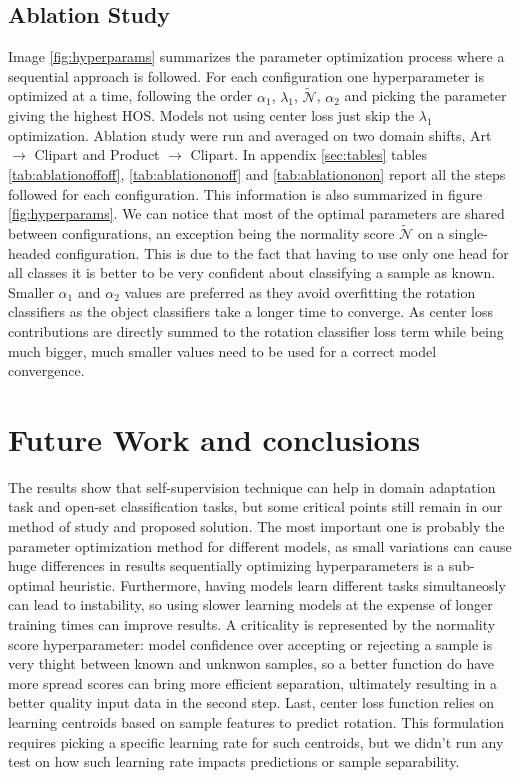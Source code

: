 \documentclass[10pt,twocolumn,letterpaper]{article}
\begin{document}
\subsection{Ablation Study}
\label{sec:ablation_study}
Image \ref{fig:hyperparams} summarizes the parameter optimization process where a sequential approach is followed.
For each configuration one hyperparameter is optimized at a time,
following the order
$\alpha_1$, $\lambda_1$, $\mathcal{\tilde N}$, $\alpha_2$ and picking the parameter giving the highest HOS.
Models not using center loss just skip the $\lambda_1$ optimization.
Ablation study were run and averaged on two domain shifts, 
Art $\to$ Clipart and Product $\to$ Clipart.
In appendix \ref{sec:tables} tables \ref{tab:ablationoffoff}, \ref{tab:ablationonoff} and \ref{tab:ablationonon} report all the steps followed for each configuration.
This information is also summarized in figure \ref{fig:hyperparams}.
We can notice that most of the optimal parameters are shared between configurations,
an exception being the normality score $\mathcal{\tilde N}$ on a single-headed configuration.
This is due to the fact that having to use only one head for all classes it is better to be very confident about classifying a sample as known.
Smaller $\alpha_1$ and $\alpha_2$ values are preferred as they avoid overfitting the rotation classifiers as the object classifiers take a longer time to converge.
As center loss contributions are directly summed to the rotation classifier loss term while being much bigger, 
much smaller values need to be used for a correct model convergence.


\section{Future Work and conclusions}
\label{sec:future_work}

The results show that self-supervision technique can help in domain adaptation task and open-set classification tasks,
but some critical points still remain in our method of study and proposed solution.
The most important one is probably the parameter optimization method for different models,
as small variations can cause huge differences in results sequentially optimizing hyperparameters is a sub-optimal heuristic.
Furthermore,
having models learn different tasks simultaneosly can lead to instability, 
so using slower learning models at the expense of longer training times can improve results.
A criticality is represented by the normality score hyperparameter:
model confidence over accepting or rejecting a sample is very thight between known and unknwon samples,
so a better function do have more spread scores can bring more efficient separation,
ultimately resulting in a better quality input data in the second step.
Last,
center loss function relies on learning centroids based on sample features to predict rotation.
This formulation requires picking a specific learning rate for such centroids,
but we didn't run any test on how such learning rate impacts predictions or sample separability.
\end{document}
